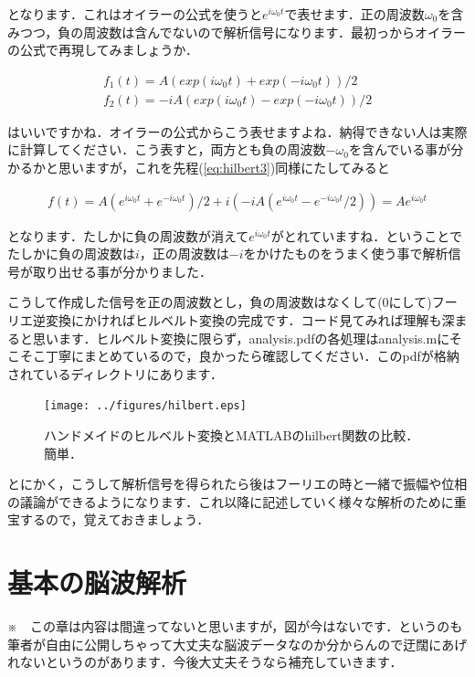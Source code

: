 \documentclass[11pt,a4paper]{ujreport} 	%
\begin{document}
となります．これはオイラーの公式を使うと$e^{i\omega_0 t}$で表せます．正の周波数$\omega_0$を含みつつ，負の周波数は含んでないので解析信号になります．最初っからオイラーの公式で再現してみましょうか．

\begin{eqnarray}
  f_1(t) = A(exp(i\omega_0 t) + exp(-i\omega_0 t))/2 \nonumber \\
  f_2(t) = -iA(exp(i\omega_0 t) - exp(-i\omega_0 t))/2
\end{eqnarray}

はいいですかね．オイラーの公式からこう表せますよね．納得できない人は実際に計算してください．こう表すと，両方とも負の周波数$-\omega_0$を含んでいる事が分かるかと思いますが，これを先程(\ref{eq:hilbert3})同様にたしてみると

\begin{align}
  f(t) = A(e^{i\omega_0 t} + e^{-i\omega_0 t})/2 + i(-iA(e^{i\omega_0 t} - e^{-i\omega_0 t}/2)) = A e^{i\omega_0 t}
\end{align}

となります．たしかに負の周波数が消えて$e^{i\omega_0 t}$がとれていますね．ということでたしかに負の周波数は$i$，正の周波数は$-i$をかけたものをうまく使う事で解析信号が取り出せる事が分かりました．

こうして作成した信号を正の周波数とし，負の周波数はなくして(0にして)フーリエ逆変換にかければヒルベルト変換の完成です．コード見てみれば理解も深まると思います．ヒルベルト変換に限らず，analysis.pdfの各処理はanalysis.mにそこそこ丁寧にまとめているので，良かったら確認してください．このpdfが格納されているディレクトリにあります．

\begin{figure}[H]
  \centering
  \texttt{[image: ../figures/hilbert.eps]}
  \caption{ハンドメイドのヒルベルト変換とMATLABのhilbert関数の比較．簡単．}
\end{figure}

とにかく，こうして解析信号を得られたら後はフーリエの時と一緒で振幅や位相の議論ができるようになります．これ以降に記述していく様々な解析のために重宝するので，覚えておきましょう．

















\chapter{基本の脳波解析}
※　この章は内容は間違ってないと思いますが，図が今はないです．というのも筆者が自由に公開しちゃって大丈夫な脳波データなのか分からんので迂闊にあげれないというのがあります．今後大丈夫そうなら補充していきます．\\\\\\\\
\end{document}
